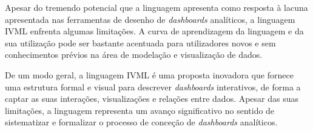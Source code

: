 Apesar do tremendo potencial que a linguagem apresenta como resposta à lacuna apresentada nas ferramentas de desenho de \textit{dashboards} analíticos, a linguagem \gls{IVML} enfrenta algumas limitações. A curva de aprendizagem da linguagem e da sua utilização pode ser bastante acentuada para utilizadores novos e sem conhecimentos prévios na área de modelação e visualização de dados. 

De um modo geral, a linguagem \gls{IVML} é uma proposta inovadora que fornece uma estrutura formal e visual para descrever \textit{dashboards} interativos, de forma a captar as suas interações, visualizações e relações entre dados. Apesar das suas limitações, a linguagem representa um avanço significativo no sentido de sistematizar e formalizar o processo de conceção de \textit{dashboards} analíticos.
